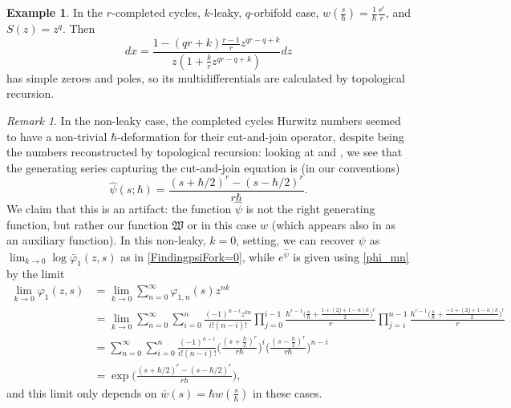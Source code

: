 \documentclass[10pt,a4paper,oneside,no-math,reqno]{amsart}%
\theoremstyle{plain}
\theoremstyle{definition}
\newtheorem{example}[theorem]{Example}
\theoremstyle{remark}
\newtheorem{remark}[theorem]{Remark}
\numberwithin{equation}{section}
\renewcommand{\phi}{\varphi}
\newcommand{\mf}[1]{\mathfrak{#1}}
\newcommand{\1}{\mathds{1}}
\newcommand{\<}{\langle}
\renewcommand{\>}{\rangle}
\begin{document}
\begin{example}
    In the $r$-completed cycles, $k$-leaky, $q$-orbifold case, $ w(\frac{s}{\hbar}) = \frac{1}{\hbar} \frac{s^r}{r}$, and $ S(z) = z^q$. Then
    \begin{equation}
		dx
		=
		\frac{1 - (qr+k) \frac{r-1}{r} z^{qr - q +k }}{z ( 1 + \frac{k}{r} z^{qr-q + k} )} dz
	\end{equation}
    has simple zeroes and poles, so its multidifferentials are calculated by topological recursion.
\end{example}

\begin{remark}
    In the non-leaky case, the completed cycles Hurwitz numbers seemed to have a non-trivial $\hbar$-deformation for their cut-and-join operator, despite being the numbers reconstructed by topological recursion: looking at \cite[Remark 1.4]{BDKS22} and \cite[Table 2]{BDKS24}, we see that the generating series capturing the cut-and-join equation is (in our conventions)
    \begin{equation}
        \hat{\psi} (s; \hbar ) = \frac{(s + \hbar/2)^r - (s - \hbar/2)^r}{r\hbar}.
    \end{equation}
    We claim that this is an artifact: the function $ \hat{\psi} $ is not the right generating function, but rather our function  $ \mf{W}$ or in this case $w$ (which appears also in \cite[Equation (58)]{BDKS24} as an auxiliary function). In this non-leaky, $k=0$, setting, we can recover $ \psi$ as $ \lim_{k\to 0} \log \bar{\phi}_1 (z,s)$ as in \cref{FindingpsiFork=0}, while $ e^{\hat{\psi}}$ is given using \cref{phi_mn} by the limit
    \begin{equation}
        \begin{split}
            \lim_{k \to 0} \phi_1 (z,s)
            &=
            \lim_{k \to 0} \sum_{n=0}^\infty \phi_{1,n} (s) z^{nk}
            \\
            &=
            \lim_{k \to 0} \sum_{n=0}^\infty \sum_{i=0}^n \frac{(-1)^{n-i}z^{kn}}{i!(n-i)!} \prod_{j=0}^{i-1} \frac{\hbar^{r-1}\big( \frac{s}{\hbar} + \frac{1 + (2j+1-n)k}{2} \big)^r }{r}  \prod_{j=i}^{n-1} \frac{\hbar^{r-1} \big( \frac{s}{\hbar} + \frac{-1 + (2j+1-n)k}{2} \big)^r }{r} 
            \\
            &=
            \sum_{n=0}^\infty \sum_{i=0}^n \frac{(-1)^{n-i}}{i!(n-i)!}  \Big( \frac{( s + \frac{\hbar}{2} )^r}{r\hbar} \Big)^i \Big( \frac{( s - \frac{\hbar}{2} )^r}{r\hbar} \Big)^{n-i}
            \\
            &=
            \exp \Big( \frac{(s + \hbar /2)^r - (s - \hbar/2)^r}{r \hbar} \Big),
        \end{split}
    \end{equation}
    and this limit only depends on $ \bar{w} (s) = \hbar w( \frac{s}{\hbar} )$ in these cases.
\end{remark}
\end{document}
